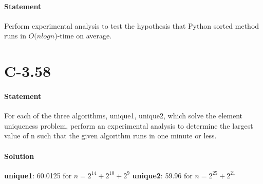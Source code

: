 \documentclass{article}
\begin{document}
\paragraph{Statement}
Perform experimental analysis to test the hypothesis that Python sorted method runs in $O(nlogn$)-time on average. 
\begin{figure}[h]
  \begin{center}
    \end{center}
  \end{figure}
\newpage \section{C-3.58}
\paragraph{Statement}
 For each of the three algorithms, unique1, unique2, which solve the element uniqueness problem, perform an experimental analysis to determine the largest value of n such that the given algorithm runs in one minute or less.
\paragraph{Solution}
    \textbf{unique1}: 60.0125 for $n = 2^14 + 2^10 + 2^9$
    \textbf{unique2}: 59.96 for $n = 2^25 + 2^21$
\end{document}
